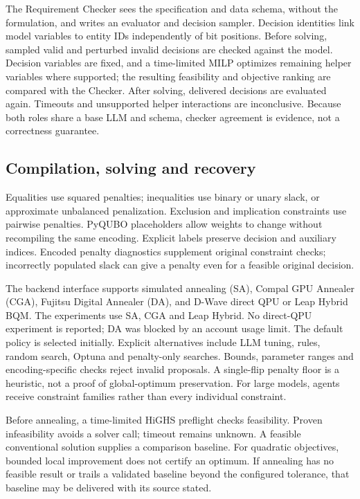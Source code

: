 The Requirement Checker sees the specification and data schema, without the formulation, and writes an
evaluator and decision sampler. Decision identities link model variables to entity IDs independently of bit
positions. Before solving, sampled valid and perturbed invalid decisions are checked against the model.
Decision variables are fixed, and a time-limited MILP optimizes remaining helper variables where supported;
the resulting feasibility and objective ranking are compared with the Checker. After solving, delivered
decisions are evaluated again. Timeouts and unsupported helper interactions are inconclusive.
Because both roles share a base LLM and schema, checker agreement is evidence, not a correctness guarantee.



\subsection{Compilation, solving and recovery}
Equalities use squared penalties; inequalities use binary or unary slack, or approximate unbalanced
penalization\cite{montanez2024unbalanced}. Exclusion and implication constraints use pairwise penalties.
PyQUBO placeholders allow weights to change without recompiling the same encoding\cite{pyquboDocs}.
Explicit labels preserve decision and auxiliary indices. Encoded penalty diagnostics supplement original
constraint checks; incorrectly populated slack can give a penalty even for a feasible original decision.

The backend interface supports simulated annealing (SA), Compal GPU Annealer (CGA), Fujitsu Digital Annealer
(DA)\cite{aramon2019digital}, and D-Wave direct QPU or Leap Hybrid BQM. The experiments use SA, CGA and Leap
Hybrid. No direct-QPU experiment is reported; DA was blocked by an account usage limit.
The default policy is selected initially. Explicit alternatives include LLM tuning, rules, random search,
Optuna\cite{akiba2019optuna} and penalty-only searches. Bounds, parameter ranges and encoding-specific checks
reject invalid proposals. A single-flip penalty floor is a heuristic, not a proof of global-optimum preservation.
For large models, agents receive constraint families rather than every individual constraint.

Before annealing, a time-limited HiGHS preflight checks feasibility. Proven infeasibility avoids a solver call;
timeout remains unknown. A feasible conventional solution supplies a comparison baseline. For quadratic
objectives, bounded local improvement does not certify an optimum. If annealing has no feasible result or
trails a validated baseline beyond the configured tolerance, that baseline may be delivered with its source stated.

